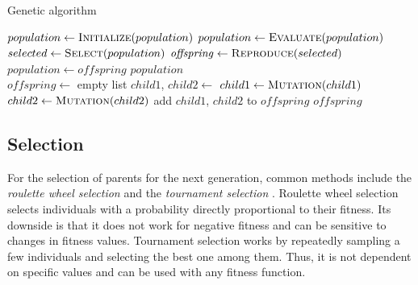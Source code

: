 \begin{algorithm}
    
    \begin{algorithmic}
    \caption{Genetic algorithm} \label{alg:genetic_algorithm}
    \State $population \gets \Call{Initialize}{population}$
    \State $population \gets \Call{Evaluate}{population}$
    \State $selected \gets \Call{Select}{population}$
    \State $\mathit{offspring} \gets \Call{Reproduce}{selected}$
    \State $population \gets \mathit{offspring}$
    \EndFor
    \State \Return $population$
    \EndFunction
    \\
    \State $\mathit{offspring} \gets$ empty list
    \State $child1$, $child2 \gets$ 
    \State $child1 \gets \Call{Mutation}{child1}$
    \EndIf
    \State $child2 \gets \Call{Mutation}{child2}$
    \EndIf
    \State add $child1$, $child2$ to $\mathit{offspring}$
    \EndFor
    \State \Return $\mathit{offspring}$
    \EndFunction
\end{algorithmic}
\end{algorithm}

\subsection{Selection}

For the selection of parents for the next generation, common methods include the \textit{roulette wheel selection} and the \textit{tournament selection} \cite{vanneschi2023lectures}. Roulette wheel selection selects individuals with a probability directly proportional to their fitness. Its downside is that it does not work for negative fitness and can be sensitive to changes in fitness values. Tournament selection works by repeatedly sampling a few individuals and selecting the best one among them. Thus, it is not dependent on specific values and can be used with any fitness function.


